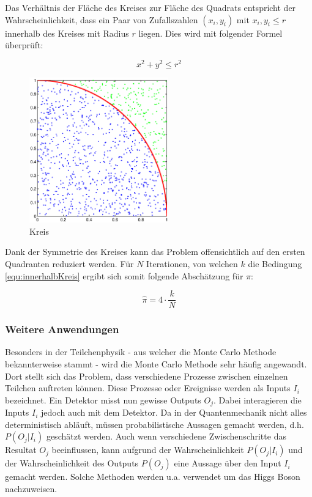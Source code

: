 \documentclass{book}
\begin{document}
\begin{refsection}
Das Verhältnis der Fläche des Kreises zur Fläche des Quadrats
entspricht der Wahrscheinlichkeit, dass ein Paar von Zufallszahlen $(x_i,y_i)$ mit $x_i,y_i \leq r$ innerhalb des Kreises mit Radius $r$ liegen. Dies wird mit folgender Formel überprüft:

\begin{equation}
	x^2 + y^2 \leq r^2
	\label{equ:innerhalbKreis}
\end{equation}

\begin{figure}[htbp]
	\centering
	\includegraphics[width=6cm]{images/kreis_hitmiss.eps}
	\caption{Kreis}
	\label{fig:KreisHitMiss}
\end{figure}

Dank der Symmetrie des Kreises kann das Problem offensichtlich auf den ersten Quadranten reduziert werden. Für $N$ Iterationen, von welchen $k$ die Bedingung \ref{equ:innerhalbKreis} ergibt sich somit folgende Abschätzung für $\pi$:

\begin{equation}
	\hat{\pi} = 4 \cdot \frac{k}{N}
\end{equation}


\subsubsection{Weitere Anwendungen}
Besonders in der Teilchenphysik - aus welcher die Monte Carlo Methode bekannterweise stammt - wird die Monte Carlo Methode sehr häufig angewandt. Dort stellt sich das Problem, dass verschiedene Prozesse zwischen einzelnen Teilchen auftreten können. Diese Prozesse oder Ereignisse werden als Inputs $I_i$ bezeichnet. Ein Detektor misst nun gewisse Outputs $O_j$. Dabei interagieren die Inputs $I_i$ jedoch auch mit dem Detektor. Da in der Quantenmechanik nicht alles deterministisch abläuft, müssen probabilistische Aussagen gemacht werden, d.h. $P(O_j | I_i)$ geschätzt werden. Auch wenn verschiedene Zwischenschritte das Resultat $O_j$ beeinflussen, kann aufgrund der Wahrscheinlichkeit $P(O_j | I_i)$ und der Wahrscheinlichkeit des Outputs $P(O_j)$ eine Aussage über den Input $I_i$ gemacht werden. Solche Methoden werden u.a. verwendet um das Higgs Boson nachzuweisen. \\


\end{refsection}
\end{document}
